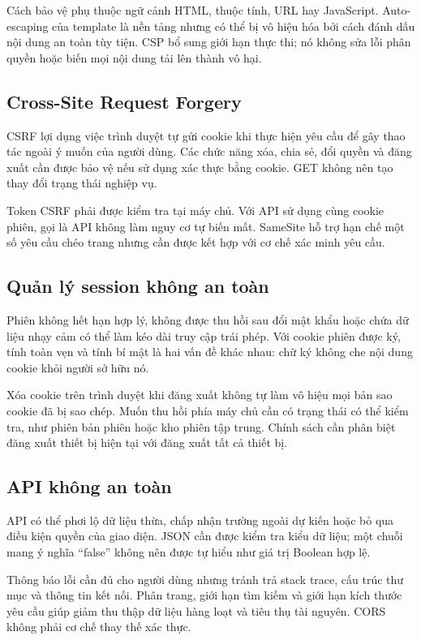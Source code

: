 Cách bảo vệ phụ thuộc ngữ cảnh HTML, thuộc tính, URL hay JavaScript. Auto-escaping của template là nền tảng nhưng có thể bị vô hiệu hóa bởi cách đánh dấu nội dung an toàn tùy tiện. CSP bổ sung giới hạn thực thi; nó không sửa lỗi phân quyền hoặc biến mọi nội dung tải lên thành vô hại.
\subsection{Cross-Site Request Forgery}
CSRF lợi dụng việc trình duyệt tự gửi cookie khi thực hiện yêu cầu để gây thao tác ngoài ý muốn của người dùng. Các chức năng xóa, chia sẻ, đổi quyền và đăng xuất cần được bảo vệ nếu sử dụng xác thực bằng cookie. GET không nên tạo thay đổi trạng thái nghiệp vụ.

Token CSRF phải được kiểm tra tại máy chủ. Với API sử dụng cùng cookie phiên, gọi là API không làm nguy cơ tự biến mất. SameSite hỗ trợ hạn chế một số yêu cầu chéo trang nhưng cần được kết hợp với cơ chế xác minh yêu cầu.
\subsection{Quản lý session không an toàn}
Phiên không hết hạn hợp lý, không được thu hồi sau đổi mật khẩu hoặc chứa dữ liệu nhạy cảm có thể làm kéo dài truy cập trái phép. Với cookie phiên được ký, tính toàn vẹn và tính bí mật là hai vấn đề khác nhau: chữ ký không che nội dung cookie khỏi người sở hữu nó.

Xóa cookie trên trình duyệt khi đăng xuất không tự làm vô hiệu mọi bản sao cookie đã bị sao chép. Muốn thu hồi phía máy chủ cần có trạng thái có thể kiểm tra, như phiên bản phiên hoặc kho phiên tập trung. Chính sách cần phân biệt đăng xuất thiết bị hiện tại với đăng xuất tất cả thiết bị.
\subsection{API không an toàn}
API có thể phơi lộ dữ liệu thừa, chấp nhận trường ngoài dự kiến hoặc bỏ qua điều kiện quyền của giao diện. JSON cần được kiểm tra kiểu dữ liệu; một chuỗi mang ý nghĩa ``false'' không nên được tự hiểu như giá trị Boolean hợp lệ.

Thông báo lỗi cần đủ cho người dùng nhưng tránh trả stack trace, cấu trúc thư mục và thông tin kết nối. Phân trang, giới hạn tìm kiếm và giới hạn kích thước yêu cầu giúp giảm thu thập dữ liệu hàng loạt và tiêu thụ tài nguyên. CORS không phải cơ chế thay thế xác thực.

